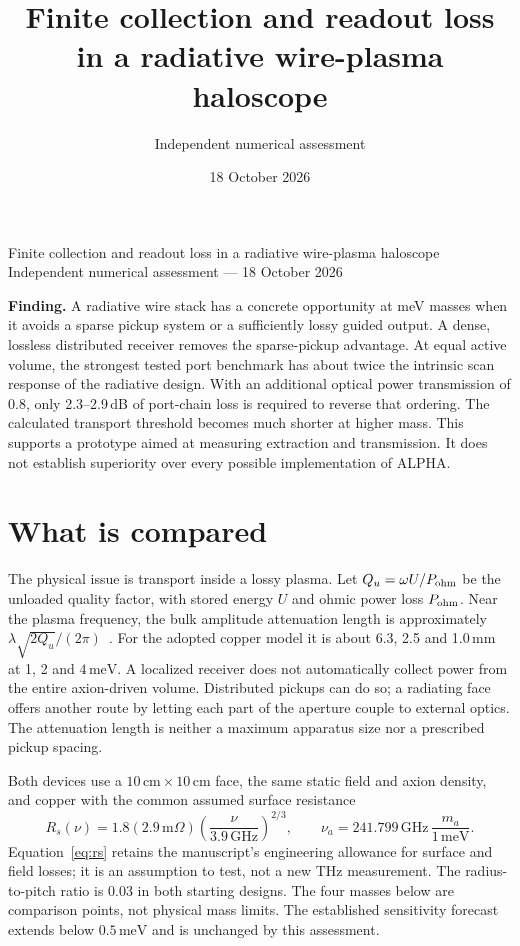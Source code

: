 \documentclass[10pt]{article}
\title{Finite collection and readout loss in a radiative wire-plasma haloscope}
\author{Independent numerical assessment}
\date{18 October 2026}
\newcommand{\meV}{\,\mathrm{meV}}
\begin{document}
\begin{center}
{\Large Finite collection and readout loss in a radiative wire-plasma haloscope}\\[6pt]
Independent numerical assessment --- 18 October 2026
\end{center}
\textbf{Finding.} A radiative wire stack has a concrete opportunity at meV masses when it avoids a sparse pickup system or a sufficiently lossy guided output. A dense, lossless distributed receiver removes the sparse-pickup advantage. At equal active volume, the strongest tested port benchmark has about twice the intrinsic scan response of the radiative design. With an additional optical power transmission of 0.8, only 2.3--2.9\,dB of port-chain loss is required to reverse that ordering. The calculated transport threshold becomes much shorter at higher mass. This supports a prototype aimed at measuring extraction and transmission. It does not establish superiority over every possible implementation of ALPHA.

\section{What is compared}
The physical issue is transport inside a lossy plasma. Let $Q_u=\omega U/P_{\rm ohm}$ be the unloaded quality factor, with stored energy $U$ and ohmic power loss $P_{\rm ohm}$. Near the plasma frequency, the bulk amplitude attenuation length is approximately $\lambda\sqrt{2Q_u}/(2\pi)$~\cite{alpha}. For the adopted copper model it is about 6.3, 2.5 and 1.0\,mm at 1, 2 and $4\meV$. A localized receiver does not automatically collect power from the entire axion-driven volume. Distributed pickups can do so; a radiating face offers another route by letting each part of the aperture couple to external optics. The attenuation length is neither a maximum apparatus size nor a prescribed pickup spacing.

Both devices use a $10\,\mathrm{cm}\times10\,\mathrm{cm}$ face, the same static field and axion density, and copper with the common assumed surface resistance
\begin{equation}
 R_s(\nu)=1.8(2.9\,\mathrm{m}\Omega)
 \left(\frac{\nu}{3.9\,\mathrm{GHz}}\right)^{2/3},\qquad
 \nu_a=241.799\,\mathrm{GHz}\,\frac{m_a}{1\meV}.
 \label{eq:rs}
\end{equation}
Equation~\eqref{eq:rs} retains the manuscript's engineering allowance for surface and field losses; it is an assumption to test, not a new THz measurement. The radius-to-pitch ratio is 0.03 in both starting designs. The four masses below are comparison points, not physical mass limits. The established sensitivity forecast extends below $0.5\meV$ and is unchanged by this assessment.
\end{document}
